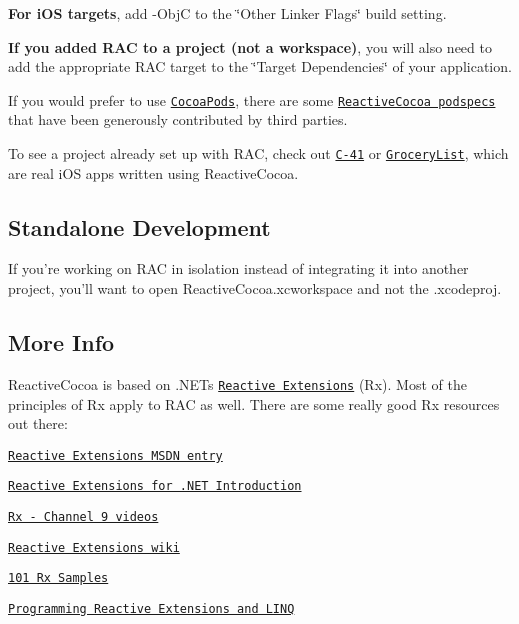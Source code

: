 \begin{DoxyEnumerate}
\item {\bfseries For i\+OS targets}, add {\ttfamily -\/\+ObjC} to the \char`\"{}\+Other Linker Flags\char`\"{} build setting.
\end{DoxyEnumerate}
\begin{DoxyEnumerate}
\item {\bfseries If you added R\+AC to a project (not a workspace)}, you will also need to add the appropriate R\+AC target to the \char`\"{}\+Target Dependencies\char`\"{} of your application.
\end{DoxyEnumerate}

If you would prefer to use \href{http://cocoapods.org}{\tt Cocoa\+Pods}, there are some \href{https://github.com/CocoaPods/Specs/tree/master/Specs/ReactiveCocoa}{\tt Reactive\+Cocoa podspecs} that have been generously contributed by third parties.

To see a project already set up with R\+AC, check out \href{https://github.com/AshFurrow/C-41}{\tt C-\/41} or \href{https://github.com/jspahrsummers/GroceryList}{\tt Grocery\+List}, which are real i\+OS apps written using Reactive\+Cocoa.

\subsection*{Standalone Development}

If you’re working on R\+AC in isolation instead of integrating it into another project, you’ll want to open {\ttfamily Reactive\+Cocoa.\+xcworkspace} and not the {\ttfamily .xcodeproj}.

\subsection*{More Info}

Reactive\+Cocoa is based on .N\+ET\textquotesingle{}s \href{http://msdn.microsoft.com/en-us/data/gg577609}{\tt Reactive Extensions} (Rx). Most of the principles of Rx apply to R\+AC as well. There are some really good Rx resources out there\+:


\begin{DoxyItemize}
\item \href{http://msdn.microsoft.com/en-us/library/hh242985.aspx}{\tt Reactive Extensions M\+S\+DN entry}
\item \href{http://leecampbell.blogspot.com/2010/08/reactive-extensions-for-net.html}{\tt Reactive Extensions for .N\+ET Introduction}
\item \href{http://channel9.msdn.com/tags/Rx/}{\tt Rx -\/ Channel 9 videos}
\item \href{http://rxwiki.wikidot.com/}{\tt Reactive Extensions wiki}
\item \href{http://rxwiki.wikidot.com/101samples}{\tt 101 Rx Samples}
\item \href{http://www.amazon.com/Programming-Reactive-Extensions-Jesse-Liberty/dp/1430237473}{\tt Programming Reactive Extensions and L\+I\+NQ}
\end{DoxyItemize}

